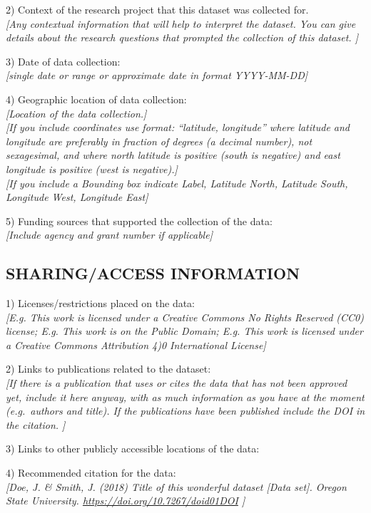 \documentclass[]{article}
\begin{document}
2) Context of the research project that this dataset was collected
for.\\
\emph{{[}Any contextual information that will help to interpret the
dataset. You can give details about the research questions that prompted
the collection of this dataset. {]}}

3) Date of data collection:\\
\emph{{[}single date or range or approximate date in format
YYYY-MM-DD{]}}

4) Geographic location of data collection:\\
\emph{{[}Location of the data collection.{]}}\\
\emph{{[}If you include coordinates use format: ``latitude, longitude''
where latitude and longitude are preferably in fraction of degrees (a
decimal number), not sexagesimal, and where north latitude is positive
(south is negative) and east longitude is positive (west is
negative).{]}}\\
\emph{{[}If you include a Bounding box indicate Label, Latitude North,
Latitude South, Longitude West, Longitude East{]}}

5) Funding sources that supported the collection of the data:\\
\emph{{[}Include agency and grant number if applicable{]}}

\subsection{SHARING/ACCESS INFORMATION}\label{sharingaccess-information}

1) Licenses/restrictions placed on the data:\\
\emph{{[}E.g. This work is licensed under a Creative Commons No Rights
Reserved (CC0) license; E.g. This work is on the Public Domain; E.g.
This work is licensed under a Creative Commons Attribution 4)0
International License{]}}

2) Links to publications related to the dataset:\\
\emph{{[}If there is a publication that uses or cites the data that has
not been approved yet, include it here anyway, with as much information
as you have at the moment (e.g.~authors and title). If the publications
have been published include the DOI in the citation. {]}}

3) Links to other publicly accessible locations of the data:

4) Recommended citation for the data:\\
\emph{{[}Doe, J. \& Smith, J. (2018) Title of this wonderful dataset
\emph{{[}Data set{]}}. Oregon State University.
\url{https://doi.org/10.7267/doid01DOI} {]}}
\end{document}
